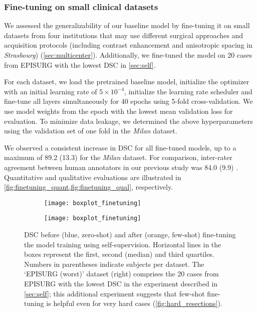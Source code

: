 \subsubsection{Fine-tuning on small clinical datasets}

We assessed the generalizability of our baseline model by fine-tuning it on small datasets from four institutions that may use different surgical approaches and acquisition protocols (including contrast enhancement and anisotropic spacing in \textit{Strasbourg}) (\cref{sec:multicenter}).
Additionally, we fine-tuned the model on 20 cases from EPISURG with the lowest \ac{DSC} in \cref{sec:self}.

For each dataset, we load the pretrained baseline model, initialize the optimizer with an initial learning rate of $5 \times 10^{-4}$, initialize the learning rate scheduler and fine-tune all layers simultaneously for 40 epochs using 5-fold cross-validation.
We use model weights from the epoch with the lowest mean validation loss for evaluation.
To minimize data leakage, we determined the above hyperparameters using the validation set of one fold in the \textit{Milan} dataset.

We observed a consistent increase in \ac{DSC} for all fine-tuned models, up to a maximum of 89.2 (13.3) for the \textit{Milan} dataset.
For comparison, inter-rater agreement between human annotators in our previous study was 84.0 (9.9) \cite{perez-garcia_simulation_2020}.
Quantitative and qualitative evaluations are illustrated in \cref{fig:finetuning_quant,fig:finetuning_qual}, respectively.


\begin{figure}
  \centering
  \begin{subfigure}[b]{0.70\linewidth}
    \centering
    \texttt{[image: boxplot\_finetuning]}
  \end{subfigure}
  \hfill
  \begin{subfigure}[b]{0.205\linewidth}
    \centering
    \texttt{[image: boxplot\_finetuning]}
  \end{subfigure}
  \caption[Dice score without before and after fine-tuning]{
    \acf{DSC} before (blue, zero-shot) and after (orange, few-shot) fine-tuning the model training using self-supervision.
    Horizontal lines in the boxes represent the first, second (median) and third quartiles.
    Numbers in parentheses indicate subjects per dataset.
    The `EPISURG (worst)' dataset (right) comprises the 20 cases from EPISURG with the lowest \ac{DSC} in the experiment described in \cref{sec:self}; this additional experiment suggests that few-shot fine-tuning is helpful even for very hard cases (\cref{fig:hard_resections}).
  }
  \label{fig:finetuning_quant}
\end{figure}


